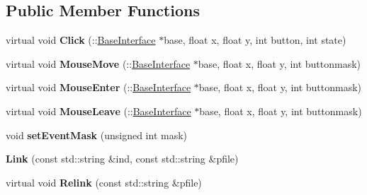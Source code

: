 \subsection*{Public Member Functions}
\begin{DoxyCompactItemize}
\item 
virtual void {\bfseries Click} (\+::\hyperlink{classBaseInterface}{Base\+Interface} $\ast$base, float x, float y, int button, int state)\hypertarget{classBaseInterface_1_1Room_1_1Link_ae30b68abfd8570b4122944e992a43375}{}\label{classBaseInterface_1_1Room_1_1Link_ae30b68abfd8570b4122944e992a43375}

\item 
virtual void {\bfseries Mouse\+Move} (\+::\hyperlink{classBaseInterface}{Base\+Interface} $\ast$base, float x, float y, int buttonmask)\hypertarget{classBaseInterface_1_1Room_1_1Link_a935d897bc0368b8a87d60dab8d40d2dd}{}\label{classBaseInterface_1_1Room_1_1Link_a935d897bc0368b8a87d60dab8d40d2dd}

\item 
virtual void {\bfseries Mouse\+Enter} (\+::\hyperlink{classBaseInterface}{Base\+Interface} $\ast$base, float x, float y, int buttonmask)\hypertarget{classBaseInterface_1_1Room_1_1Link_a344a707a59512af99c3504d00681bcc0}{}\label{classBaseInterface_1_1Room_1_1Link_a344a707a59512af99c3504d00681bcc0}

\item 
virtual void {\bfseries Mouse\+Leave} (\+::\hyperlink{classBaseInterface}{Base\+Interface} $\ast$base, float x, float y, int buttonmask)\hypertarget{classBaseInterface_1_1Room_1_1Link_ad04386eb0557ec77490f8bf1075e32a8}{}\label{classBaseInterface_1_1Room_1_1Link_ad04386eb0557ec77490f8bf1075e32a8}

\item 
void {\bfseries set\+Event\+Mask} (unsigned int mask)\hypertarget{classBaseInterface_1_1Room_1_1Link_a0aaa902be5cbb42417a5695d2b57547f}{}\label{classBaseInterface_1_1Room_1_1Link_a0aaa902be5cbb42417a5695d2b57547f}

\item 
{\bfseries Link} (const std\+::string \&ind, const std\+::string \&pfile)\hypertarget{classBaseInterface_1_1Room_1_1Link_aebfad40a529f2391eaddff8f548fff50}{}\label{classBaseInterface_1_1Room_1_1Link_aebfad40a529f2391eaddff8f548fff50}

\item 
virtual void {\bfseries Relink} (const std\+::string \&pfile)\hypertarget{classBaseInterface_1_1Room_1_1Link_a476be82817f4d606003a0bfd830af195}{}\label{classBaseInterface_1_1Room_1_1Link_a476be82817f4d606003a0bfd830af195}

\end{DoxyCompactItemize}
